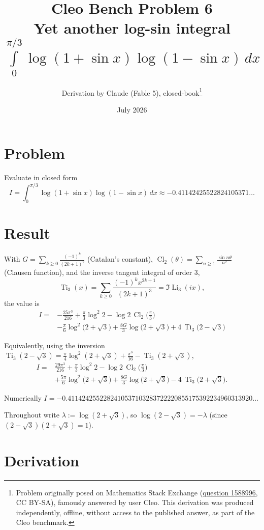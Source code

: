 \documentclass[11pt]{article}
\title{Cleo Bench Problem 6\\[1ex]\large Yet another log-sin integral $\int\limits_0^{\pi/3}\log(1+\sin x)\log(1-\sin x)\,dx$}
\author{Derivation by Claude (Fable 5), closed-book\thanks{Problem originally
posed on Mathematics Stack Exchange
(\href{https://math.stackexchange.com/q/1588996}{question 1588996}, CC BY-SA),
famously answered by user Cleo. This derivation was produced independently,
offline, without access to the published answer, as part of the Cleo benchmark.}}
\date{July 2026}
\theoremstyle{remark}
\begin{document}
\maketitle

\section*{Problem}

Evaluate in closed form
\[
I=\int_0^{\pi/3}\log(1+\sin x)\log(1-\sin x)\,dx\approx-0.41142425522824105371\ldots
\]

\section*{Result}

With $G=\sum_{k\ge0}\frac{(-1)^k}{(2k+1)^2}$ (Catalan's constant), $\operatorname{Cl}_2(\theta)=\sum_{n\ge1}\frac{\sin n\theta}{n^2}$ (Clausen function), and the inverse tangent integral of order 3,
\[
\operatorname{Ti}_3(x)=\sum_{k\ge0}\frac{(-1)^k x^{2k+1}}{(2k+1)^3}=\Im\operatorname{Li}_3(ix),
\]
the value is
\[
\boxed{\;
\begin{aligned}
I={}&-\frac{25\pi^3}{216}+\frac{\pi}{3}\log^2 2-\log 2\,\operatorname{Cl}_2\!\Big(\frac{\pi}{3}\Big)\\
&-\frac{\pi}{6}\log^2\!\big(2+\sqrt3\big)+\frac{8G}{3}\log\!\big(2+\sqrt3\big)+4\,\operatorname{Ti}_3\!\big(2-\sqrt3\big)
\end{aligned}
\;}
\]

Equivalently, using the inversion $\operatorname{Ti}_3(2-\sqrt3)=\frac{\pi}{4}\log^2(2+\sqrt3)+\frac{\pi^3}{16}-\operatorname{Ti}_3(2+\sqrt3)$,
\[
\begin{aligned}
I={}&\frac{29\pi^3}{216}+\frac{\pi}{3}\log^2 2-\log 2\,\operatorname{Cl}_2\!\Big(\frac{\pi}{3}\Big)\\
&+\frac{5\pi}{6}\log^2\!\big(2+\sqrt3\big)+\frac{8G}{3}\log\!\big(2+\sqrt3\big)-4\,\operatorname{Ti}_3\!\big(2+\sqrt3\big).
\end{aligned}
\]

Numerically $I=-0.4114242552282410537103283722220855175392234960313920\ldots$

Throughout write $\lambda:=\log(2+\sqrt3)$, so $\log(2-\sqrt3)=-\lambda$ (since $(2-\sqrt3)(2+\sqrt3)=1$).

\section*{Derivation}
\end{document}
